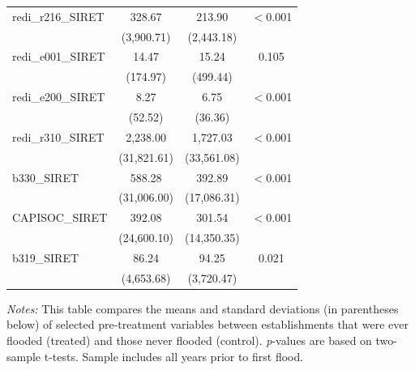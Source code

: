 \begin{table}[htbp]
\begin{threeparttable}
\begin{tabular}{lccc}
redi\_r216\_SIRET          & 328.67         & 213.90         & $<$0.001 \\
                            & (3,900.71)     & (2,443.18)     & \\
redi\_e001\_SIRET          & 14.47          & 15.24          & 0.105 \\
                            & (174.97)       & (499.44)       & \\
redi\_e200\_SIRET          & 8.27           & 6.75           & $<$0.001 \\
                            & (52.52)        & (36.36)        & \\
redi\_r310\_SIRET          & 2,238.00       & 1,727.03       & $<$0.001 \\
                            & (31,821.61)    & (33,561.08)    & \\
b330\_SIRET                & 588.28         & 392.89         & $<$0.001 \\
                            & (31,006.00)    & (17,086.31)    & \\
CAPISOC\_SIRET             & 392.08         & 301.54         & $<$0.001 \\
                            & (24,600.10)    & (14,350.35)    & \\
b319\_SIRET                & 86.24          & 94.25          & 0.021 \\
                            & (4,653.68)     & (3,720.47)     & \\
\bottomrule
\end{tabular}
\begin{tablenotes}
\small
\item \textit{Notes:} This table compares the means and standard deviations (in parentheses below) of selected pre-treatment variables between establishments that were ever flooded (treated) and those never flooded (control). \textit{p}-values are based on two-sample t-tests. Sample includes all years prior to first flood.
\end{tablenotes}
\end{threeparttable}
\end{table}